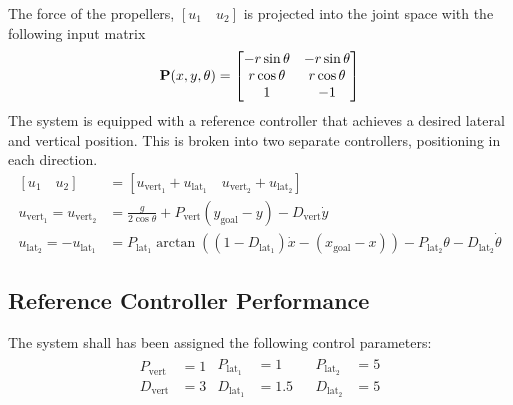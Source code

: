 \noindent The force of the propellers, $\left [ u_1 \quad u_2 \right ]$ is projected into the joint space with the following input matrix
\begin{align*}
    \P(x, y, \theta) = \begin{bmatrix}
    -r\sin{\theta} & -r\sin{\theta} \\ 
    r\cos{\theta} & r\cos{\theta} \\ 
    1 & -1 
    \end{bmatrix}
\end{align*}
\noindent The system is equipped with a reference controller that achieves a desired lateral and vertical position. This is broken into two separate controllers, positioning in each direction. 
\begin{align}
    \left [ u_1 \quad u_2 \right ] &= \left [u_{\text{vert}_1} + u_{\text{lat}_1} \quad u_{\text{vert}_2} + u_{\text{lat}_2}\right ] \\
    u_{\text{vert}_1} = u_{\text{vert}_2} &= \frac{g}{2 \cos{\theta}} + P_{\text{vert}} \left (y_{\text{goal}} -  y\right) - D_{\text{vert}}\dot{y} \\
    u_{\text{lat}_2} = -u_{\text{lat}_1} &= P_{\text{lat}_1}\arctan{\left ((1 - D_{\text{lat}_1})\dot{x} - (x_{\text{goal}} - x) \right )} -  P_{\text{lat}_2}\theta - D_{\text{lat}_2}\dot{\theta}
\end{align}
\subsection{Reference Controller Performance}

\noindent The system shall has been assigned the following control parameters:
\begin{align*}
\begin{split}
    P_{\text{vert}} &= 1 \\
    D_{\text{vert}} &= 3
\end{split}
\begin{split}
    P_{\text{lat}_1} &= 1 \\
    D_{\text{lat}_1} &= 1.5
\end{split}
\begin{split}
\end{split}
\begin{split}
    P_{\text{lat}_2} &= 5 \\
    D_{\text{lat}_2} &= 5
\end{split}
\end{align*}


